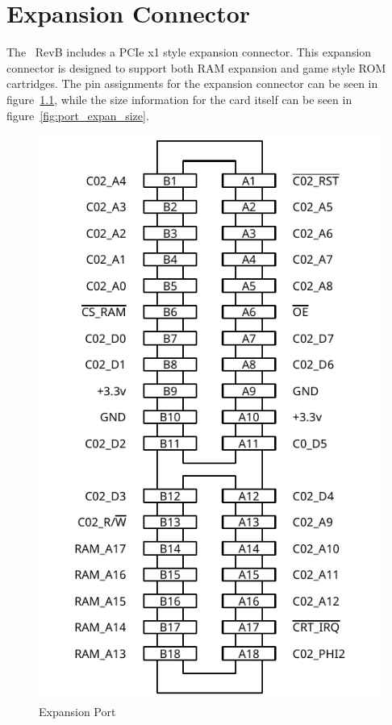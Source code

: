 \chapter{Expansion Connector}


The \jr\ RevB includes a PCIe x1 style expansion connector. This expansion connector is designed to support both RAM expansion and game style ROM cartridges. The pin assignments for the expansion connector can be seen in figure~\ref{fig:port_expansion}, while the size information for the card itself can be seen in figure~\ref{fig:port_expan_size}.

\begin{figure}[ht]
    \begin{center}
        \includegraphics[scale=0.65]{images/f256_port_expansion.pdf}
    \end{center}
    \caption{Expansion Port}
    \label{fig:port_expansion}
\end{figure}


